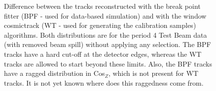 \documentclass[12pt]{article}
\begin{document}
\begin{figure}[!ht]
\centering
{}
\vspace*{-6mm}
\caption{Difference between the tracks reconstructed with the break point fitter (BPF - used for data-based simulation) and with the window cosmictrack (WT - used for generating the calibration samples) algorithms. Both distributions are for the period 4 Test Beam data (with removed beam spill) without applying any selection. The BPF tracks have a hard cut-off at the detector edges, whereas the WT tracks are allowed to start beyond these limits. Also, the BPF tracks have a ragged distribution in Cos$_Z$, which is not present for WT tracks. It is not yet known where does this raggedness come from.}
\label{figTrackComparison}
\end{figure}
\end{document}
